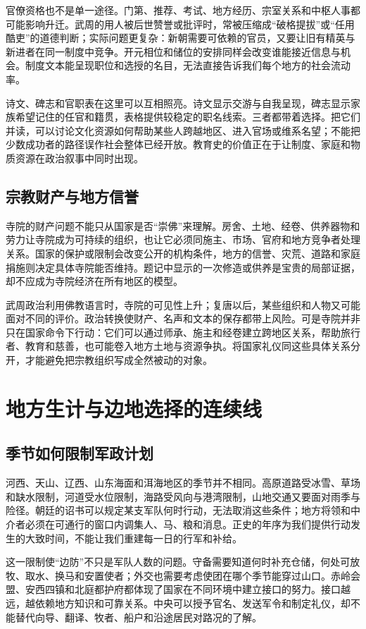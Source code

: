 官僚资格也不是单一途径。门第、推荐、考试、地方经历、宗室关系和中枢人事都可能影响升迁。武周的用人被后世赞誉或批评时，常被压缩成“破格提拔”或“任用酷吏”的道德判断；实际问题更复杂：新朝需要可依赖的官员，又要让旧有精英与新进者在同一制度中竞争。开元相位和储位的安排同样会改变谁能接近信息与机会。制度文本能呈现职位和选授的名目，无法直接告诉我们每个地方的社会流动率。

诗文、碑志和官职表在这里可以互相照亮。诗文显示交游与自我呈现，碑志显示家族希望记住的任官和籍贯，表格提供较稳定的职名线索。三者都带着选择。把它们并读，可以讨论文化资源如何帮助某些人跨越地区、进入官场或维系名望；不能把少数成功者的路径误作社会整体已经开放。教育史的价值正在于让制度、家庭和物质资源在政治叙事中同时出现。

\subsection{宗教财产与地方信誉}
寺院的财产问题不能只从国家是否“崇佛”来理解。房舍、土地、经卷、供养器物和劳力让寺院成为可持续的组织，也让它必须同施主、市场、官府和地方竞争者处理关系。国家的保护或限制会改变公开的机构条件，地方的信誉、灾荒、道路和家庭捐施则决定具体寺院能否维持。题记中显示的一次修造或供养是宝贵的局部证据，却不应成为寺院经济在所有地区的模型。

武周政治利用佛教语言时，寺院的可见性上升；复唐以后，某些组织和人物又可能面对不同的评价。政治转换使财产、名声和文本的保存都带上风险。可是寺院并非只在国家命令下行动：它们可以通过师承、施主和经卷建立跨地区关系，帮助旅行者、教育和慈善，也可能卷入地方土地与资源争执。将国家礼仪同这些具体关系分开，才能避免把宗教组织写成全然被动的对象。

\section{地方生计与边地选择的连续线}
\subsection{季节如何限制军政计划}
河西、天山、辽西、山东海面和洱海地区的季节并不相同。高原道路受冰雪、草场和缺水限制，河道受水位限制，海路受风向与港湾限制，山地交通又要面对雨季与险径。朝廷的诏书可以规定某支军队何时行动，无法取消这些条件；地方将领和中介者必须在可通行的窗口内调集人、马、粮和消息。正史的年序为我们提供行动发生的大致时间，不能让我们重建每一日的行军和补给。

这一限制使“边防”不只是军队人数的问题。守备需要知道何时补充仓储，何处可放牧、取水、换马和安置使者；外交也需要考虑使团在哪个季节能穿过山口。赤岭会盟、安西四镇和北庭都护府都体现了国家在不同环境中建立接口的努力。接口越远，越依赖地方知识和可靠关系。中央可以授予官名、发送军令和制定礼仪，却不能替代向导、翻译、牧者、船户和沿途居民对路况的了解。

